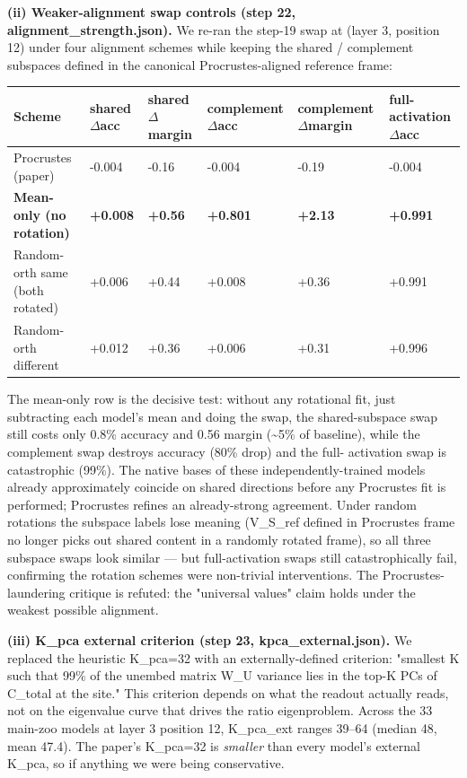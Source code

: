 \textbf{(ii) Weaker-alignment swap controls (step 22, alignment\_strength.json).}
We re-ran the step-19 swap at (layer 3, position 12) under four
alignment schemes while keeping the shared / complement subspaces
defined in the canonical Procrustes-aligned reference frame:

\begin{center}
\begin{tabular}{|l|l|l|l|l|l|}
\hline
\textbf{Scheme} & \textbf{shared $\Delta$acc} & \textbf{shared $\Delta$margin} & \textbf{complement $\Delta$acc} & \textbf{complement $\Delta$margin} & \textbf{full-activation $\Delta$acc} \\
\hline
Procrustes (paper) & -0.004 & -0.16 & -0.004 & -0.19 & -0.004 \\
\textbf{Mean-only (no rotation)} & \textbf{+0.008} & \textbf{+0.56} & \textbf{+0.801} & \textbf{+2.13} & \textbf{+0.991} \\
Random-orth same (both rotated) & +0.006 & +0.44 & +0.008 & +0.36 & +0.991 \\
Random-orth different & +0.012 & +0.36 & +0.006 & +0.31 & +0.996 \\
\hline
\end{tabular}
\end{center}


The mean-only row is the decisive test: without any rotational fit, just
subtracting each model's mean and doing the swap, the shared-subspace
swap still costs only 0.8\% accuracy and 0.56 margin (\textasciitilde{}5\% of baseline),
while the complement swap destroys accuracy (80\% drop) and the full-
activation swap is catastrophic (99\%). The native bases of these
independently-trained models already approximately coincide on shared
directions before any Procrustes fit is performed; Procrustes refines
an already-strong agreement. Under random rotations the subspace
labels lose meaning (V\_S\_ref defined in Procrustes frame no longer
picks out shared content in a randomly rotated frame), so all three
subspace swaps look similar --- but full-activation swaps still
catastrophically fail, confirming the rotation schemes were non-trivial
interventions. The Procrustes-laundering critique is refuted: the
"universal values" claim holds under the weakest possible alignment.

\textbf{(iii) K\_pca external criterion (step 23, kpca\_external.json).}
We replaced the heuristic K\_pca=32 with an externally-defined criterion:
"smallest K such that 99\% of the unembed matrix W\_U variance lies in the
top-K PCs of C\_total at the site." This criterion depends on what the
readout actually reads, not on the eigenvalue curve that drives the
ratio eigenproblem. Across the 33 main-zoo models at layer 3 position
12, K\_pca\_ext ranges 39--64 (median 48, mean 47.4). The paper's
K\_pca=32 is \emph{smaller} than every model's external K\_pca, so if
anything we were being conservative.

